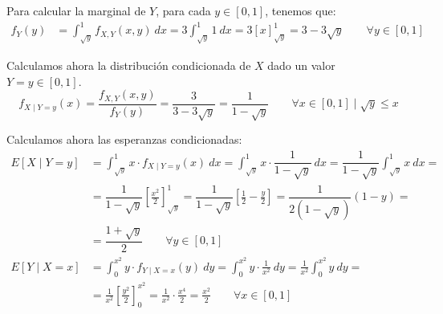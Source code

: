 \begin{ejercicio}
\begin{enumerate}
        Para calcular la marginal de $Y$, para cada $y\in[0,1]$, tenemos que:
        \begin{align*}
            f_Y(y) &= \int_{\sqrt{y}}^{1} f_{X,Y}(x,y) \ dx
            = 3\int_{\sqrt{y}}^{1} 1 \ dx
            = 3\left[x\right]_{\sqrt{y}}^{1}
            =3-3\sqrt{y}\qquad \forall y\in[0,1]
        \end{align*}

        Calculamos ahora la distribución condicionada de $X$ dado un valor $Y = y\in [0,1]$.
        \begin{equation*}
            f_{X\mid Y=y}(x) = \dfrac{f_{X,Y}(x,y)}{f_Y(y)}
            = \dfrac{3}{3-3\sqrt{y}} = \dfrac{1}{1-\sqrt{y}}
            \qquad \forall x\in[0,1] \mid \sqrt{y}\leq x
        \end{equation*}

        Calculamos ahora las esperanzas condicionadas:
        \begin{align*}
            E[X\mid Y = y] &= \int_{\sqrt{y}}^{1} x\cdot f_{X\mid Y=y}(x) \ dx
            = \int_{\sqrt{y}}^{1} x\cdot \dfrac{1}{1-\sqrt{y}} \ dx
            = \dfrac{1}{1-\sqrt{y}}\int_{\sqrt{y}}^{1} x \ dx
            =\\&= \dfrac{1}{1-\sqrt{y}}\left[\frac{x^2}{2}\right]_{\sqrt{y}}^{1}
            = \dfrac{1}{1-\sqrt{y}}\left[\frac{1}{2} - \frac{y}{2}\right]
            = \dfrac{1}{2(1-\sqrt{y})}\left(1 - y\right)
            =\\&= \dfrac{1+\sqrt{y}}{2} \qquad\forall y\in[0,1]\\
            E[Y\mid X = x] &= \int_{0}^{x^2} y\cdot f_{Y\mid X=x}(y) \ dy
            = \int_{0}^{x^2} y\cdot \frac{1}{x^2} \ dy
            = \frac{1}{x^2}\int_{0}^{x^2} y \ dy
            =\\&= \frac{1}{x^2}\left[\frac{y^2}{2}\right]_{0}^{x^2}
            = \frac{1}{x^2}\cdot \frac{x^4}{2}
            = \frac{x^2}{2} \qquad \forall x\in[0,1]
        \end{align*}
    \end{enumerate}
\end{ejercicio}


